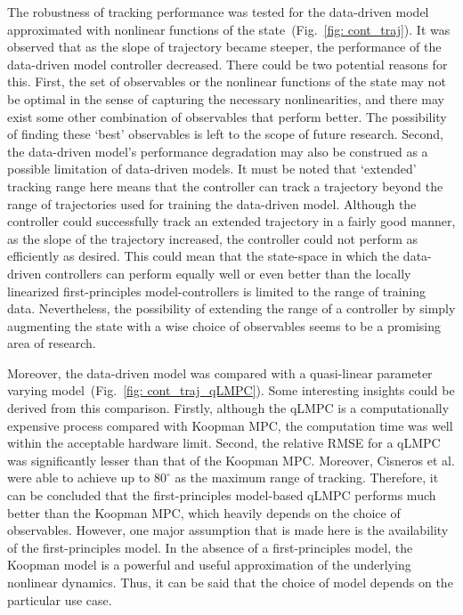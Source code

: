 The robustness of tracking performance was tested for the data-driven model approximated with nonlinear functions of the state~(Fig.~\ref{fig: cont_traj}). It was observed that as the slope of trajectory became steeper, the performance of the data-driven model controller decreased. There could be two potential reasons for this. First, the set of observables or the nonlinear functions of the state may not be optimal in the sense of capturing the necessary nonlinearities, and there may exist some other combination of observables that perform better. The possibility of finding these `best' observables is left to the scope of future research. Second, the data-driven model's performance degradation may also be construed as a possible limitation of data-driven models. It must be noted that `extended' tracking range here means that the controller can track a trajectory beyond the range of trajectories used for training the data-driven model. Although the controller could successfully track an extended trajectory in a fairly good manner, as the slope of the trajectory increased, the controller could not perform as efficiently as desired. This could mean that the state-space in which the data-driven controllers can perform equally well or even better than the locally linearized first-principles model-controllers is limited to the range of training data. Nevertheless, the possibility of extending the range of a controller by simply augmenting the state with a wise choice of observables seems to be a promising area of research.\par
Moreover, the data-driven model was compared with a quasi-linear parameter varying model~(Fig.~\ref{fig: cont_traj_qLMPC}). Some interesting insights could be derived from this comparison. Firstly, although the qLMPC is a computationally expensive process compared with Koopman MPC, the computation time was well within the acceptable hardware limit. Second, the relative RMSE for a qLMPC was significantly lesser than that of the Koopman MPC. Moreover, Cisneros et al. \cite{qLMPC} were able to achieve up to $80^\circ$ as the maximum range of tracking. Therefore, it can be concluded that the first-principles model-based qLMPC performs much better than the Koopman MPC, which heavily depends on the choice of observables. However, one major assumption that is made here is the availability of the first-principles model. In the absence of a first-principles model, the Koopman model is a powerful and useful approximation of the underlying nonlinear dynamics. Thus, it can be said that the choice of model depends on the particular use case. \par

